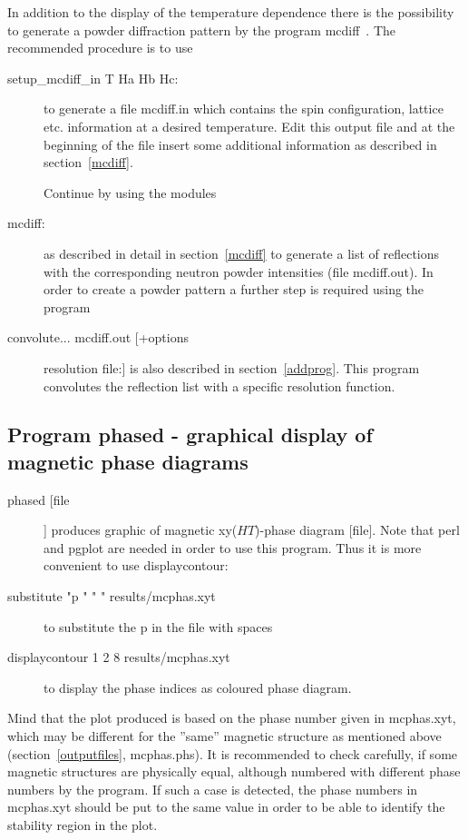 In addition to the display of the temperature dependence there is the
possibility to generate a powder diffraction pattern by the 
program mcdiff~. The 
recommended procedure is to use 

\begin{description}
\item[{\prg setup\_mcdiff\_in} T Ha Hb Hc:] to generate a file {\prg mcdiff.in} which
contains the spin configuration, lattice etc. information at a
desired temperature. Edit this output file and at the beginning
of the file insert some additional information as described in section~\ref{mcdiff}.

Continue by using  the modules
\item[{\prg mcdiff}:] as described in detail in section~\ref{mcdiff} to
generate a list of reflections with the corresponding neutron powder
intensities (file {\prg mcdiff.out}). In order to create a powder pattern 
a further step is required using the program
\item[{\prg convolute}... mcdiff.out [+options] resolution file:]
  is also described in section~\ref{addprog}. This program convolutes the
reflection list with a specific resolution function.
\end{description}

\clearpage

\subsection{Program {\prg phased} - graphical display of magnetic phase diagrams}
\begin{description}
\item [phased    [file]]       produces graphic of magnetic xy($HT$)-phase diagram [file]. Note that
{\prg perl} and {\prg pgplot} are needed in order to use this program. Thus it is more
convenient to use {\prg displaycontour}:
\item [substitute "p " "  " results/mcphas.xyt] to substitute the p in the file with spaces
\item [displaycontour 1 2 8 results/mcphas.xyt] to display the phase indices as coloured phase diagram.
\end{description}

Mind that the plot produced is based on the phase number given in {\prg mcphas.xyt}, which may be
different for the ''same'' magnetic structure as mentioned above
(section~\ref{outputfiles}, {\prg mcphas.phs}). It is recommended to check carefully, if
some magnetic structures are physically equal, although numbered with different phase numbers by
the program. If such a case is detected, the phase numbers in {\prg mcphas.xyt} should
be put to the same value in order to be able to identify the stability region in the plot.

